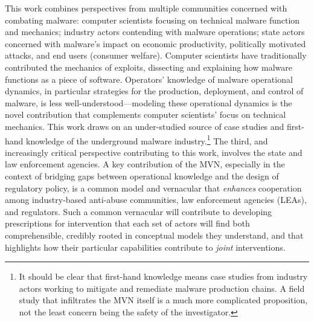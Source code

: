 \documentclass[12pt,journal,compsoc,letterpaper,onecolumn,twoside]{IEEEtran}
\begin{document}
This work combines perspectives from multiple communities
concerned with combating malware: 
computer scientists focusing on technical malware function and mechanics; 
industry actors contending with malware operations;  
state actors concerned with 
malware's impact on economic productivity, politically motivated
attacks, and end users (consumer welfare). 
%
%
Computer scientists have traditionally contributed 
the mechanics of exploits, dissecting and explaining how malware functions
as a piece of software.
%
Operators' knowledge of malware operational dynamics, in particular
strategies for the 
production, deployment, and control of malware, is less
well-understood---modeling these operational dynamics is the novel
contribution that complements computer 
scientists' focus 
on technical mechanics.
%
This work draws on an under-studied source of
case studies and first-hand knowledge of the underground malware
industry.\footnote{It should be clear that first-hand knowledge means
  case studies from industry actors working to mitigate and remediate
  malware production chains.  A field study that infiltrates the
  MVN itself is a much more complicated proposition, not the least
  concern being the safety of the investigator.}
%
The third, and increasingly critical perspective contributing to this
work, involves the state 
and law enforcement agencies.  
%
A key contribution of the MVN, especially in the context of bridging 
gaps between operational knowledge and the design of regulatory
policy, is a common model and vernacular that \emph{enhances}
cooperation among 
industry-based anti-abuse communities, law enforcement agencies
(LEAs), and regulators.
%
Such a common vernacular will contribute to developing 
prescriptions for intervention that each set of actors will find both
comprehensible, credibly rooted in conceptual models they understand,
and that highlights how their particular capabilities contribute to \emph{joint}
interventions. 
\end{document}
